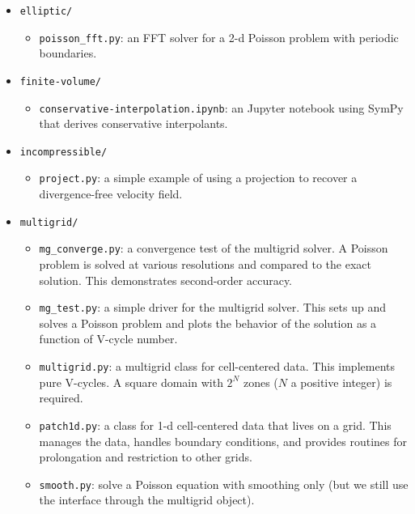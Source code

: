 \begin{itemize}
\item {\tt elliptic/}

  \begin{itemize}
    \item {\tt poisson\_fft.py}: an FFT solver for a 2-d Poisson problem
    with periodic boundaries.
  \end{itemize}

\item {\tt finite-volume/}

  \begin{itemize}
  \item {\tt conservative-interpolation.ipynb}: an {\sf Jupyter} notebook
    using {\sf SymPy} that derives conservative interpolants.
  \end{itemize}

\item {\tt incompressible/}

  \begin{itemize}
  \item {\tt project.py}: a simple example of using a projection
    to recover a divergence-free velocity field.
  \end{itemize}

\item {\tt multigrid/}

  \begin{itemize}
  \item {\tt mg\_converge.py}: a convergence test of the multigrid
    solver.  A Poisson problem is solved at various resolutions and
    compared to the exact solution.  This demonstrates second-order
    accuracy.

  \item {\tt mg\_test.py}: a simple driver for the multigrid solver.
    This sets up and solves a Poisson problem and plots the behavior
    of the solution as a function of V-cycle number.

  \item{\tt multigrid.py}: a multigrid class for cell-centered data.
    This implements pure V-cycles.  A square domain with $2^N$ zones
    ($N$ a positive integer) is required.

  \item {\tt patch1d.py}: a class for 1-d cell-centered data that
    lives on a grid.  This manages the data, handles boundary
    conditions, and provides routines for prolongation and restriction
    to other grids.

  \item {\tt smooth.py}: solve a Poisson equation with smoothing
    only (but we still use the interface through the multigrid object).


\end{itemize}
\end{itemize}
